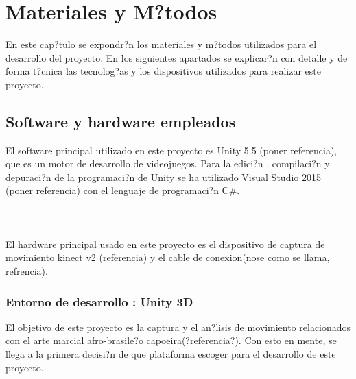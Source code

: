 %
%

\chapter{Materiales y M?todos}


\label{cap4:sec:kinect}
En este cap?tulo se expondr?n los  materiales  y m?todos utilizados para el desarrollo del proyecto. En los siguientes apartados se explicar?n con detalle y de forma t?cnica las tecnolog?as y los dispositivos utilizados para realizar este proyecto.


\section{Software y hardware empleados}
\label{cap4:sec:Software y hardware empleados}
El software principal utilizado en este proyecto es Unity 5.5 (poner referencia), que es un motor de desarrollo de videojuegos.
Para la edici?n , compilaci?n y depuraci?n de la programaci?n de Unity se ha utilizado Visual Studio 2015 (poner referencia) con el lenguaje de programaci?n C\#.\\
\\
\\
\\

El hardware principal usado en este proyecto es el dispositivo de captura de movimiento kinect v2 (referencia) y el cable de conexion(nose como se llama, refrencia).







\subsection{Entorno de desarrollo : Unity 3D}
\label{cap4:sec:Entorno de desarrollo : Unity 3D}
El objetivo de este proyecto es la captura y el an?lisis de movimiento relacionados con el arte marcial afro-brasile?o capoeira(?referencia?). Con esto en mente, se llega a la primera decisi?n de que plataforma escoger para el desarrollo de este proyecto.\\


